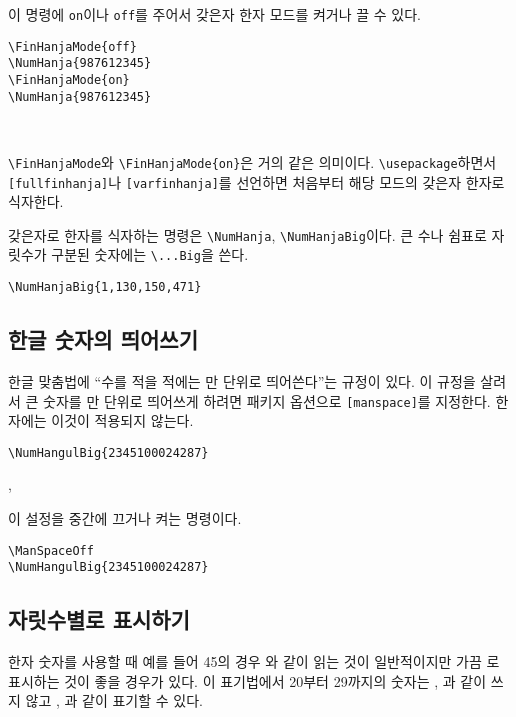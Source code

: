 \documentclass[b5paper,nanum]{oblivoir}
\def\cs#1{\texttt{\textbackslash #1}}
\def\ct#1{\texttt{#1}}
\begin{document}
\medskip

이 명령에 \ct{on}이나 \ct{off}를 주어서 갖은자 한자 모드를 켜거나 끌 수 있다.
\begin{verbatim}
\FinHanjaMode{off}
\NumHanja{987612345}
\FinHanjaMode{on}
\NumHanja{987612345}
\end{verbatim}
 \\

\medskip

\cs{FinHanjaMode}와 \cs{FinHanjaMode\{on\}}은 거의 같은 의미이다.
\cs{usepackage}하면서 \ct{[fullfinhanja]}나 \ct{[varfinhanja]}를 선언하면 처음부터 해당 모드의 갖은자 한자로 식자한다.

\medskip

갖은자로 한자를 식자하는 명령은 \cs{NumHanja}, \cs{NumHanjaBig}이다.
큰 수나 쉼표로 자릿수가 구분된 숫자에는 \cs{...Big}을 쓴다.

\begin{verbatim}
\NumHanjaBig{1,130,150,471}
\end{verbatim}


\subsection{한글 숫자의 띄어쓰기}\label{sec:manspace}

한글 맞춤법에 ``수를 적을 적에는 만 단위로 띄어쓴다''는 규정이 있다. 이 규정을 살려서 큰 숫자를 만 단위로
띄어쓰게 하려면 패키지 옵션으로 \ct{[manspace]}를 지정한다. 한자에는 이것이 적용되지 않는다.

\ManSpaceOn
\begin{verbatim}
\NumHangulBig{2345100024287}
\end{verbatim}

\begin{boxedverbatim}
\ManSpaceOn, \ManSpaceOff
\end{boxedverbatim}
이 설정을 중간에 끄거나 켜는 명령이다.

\begin{verbatim}
\ManSpaceOff
\NumHangulBig{2345100024287}
\end{verbatim}
\ManSpaceOff
{}

\subsection{자릿수별로 표시하기}\label{sec:twenty}
\begin{boxedverbatim}
\TwentyHanjaChar[2|20|30|21|31]
\end{boxedverbatim}
한자 숫자를 사용할 때 예를 들어 45의 경우 와 같이 읽는 것이 일반적이지만
가끔 로 표시하는 것이 좋을 경우가 있다.
이 표기법에서 20부터 29까지의 숫자는 ,
과 같이 쓰지 않고 \TwentyHanjaChar[20], 과 같이
표기할 수 있다.
\end{document}
